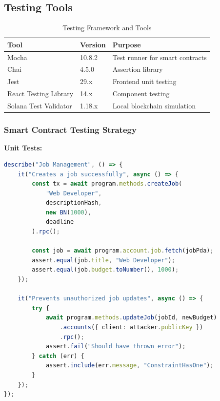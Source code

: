 \documentclass[a4paper,13pt,twoside]{report}
\theoremstyle{definition}
\begin{document}
\subsection{Testing Tools}

\begin{table}[h]
\centering
\caption{Testing Framework and Tools}
\begin{tabular}{|l|l|l|}
\hline
\textbf{Tool} & \textbf{Version} & \textbf{Purpose} \\
\hline
Mocha & 10.8.2 & Test runner for smart contracts \\
Chai & 4.5.0 & Assertion library \\
Jest & 29.x & Frontend unit testing \\
React Testing Library & 14.x & Component testing \\
Solana Test Validator & 1.18.x & Local blockchain simulation \\
\hline
\end{tabular}
\end{table}

\subsubsection{Smart Contract Testing Strategy}

\textbf{Unit Tests:}
\begin{lstlisting}[language=TypeScript, caption=Anchor Test Example]
describe("Job Management", () => {
    it("Creates a job successfully", async () => {
        const tx = await program.methods.createJob(
            "Web Developer",
            descriptionHash,
            new BN(1000),
            deadline
        ).rpc();

        const job = await program.account.job.fetch(jobPda);
        assert.equal(job.title, "Web Developer");
        assert.equal(job.budget.toNumber(), 1000);
    });

    it("Prevents unauthorized job updates", async () => {
        try {
            await program.methods.updateJob(jobId, newBudget)
                .accounts({ client: attacker.publicKey })
                .rpc();
            assert.fail("Should have thrown error");
        } catch (err) {
            assert.include(err.message, "ConstraintHasOne");
        }
    });
});
\end{lstlisting}
\end{document}
